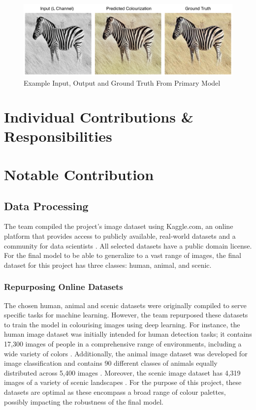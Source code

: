 \documentclass{article} %
\begin{document}
\begin{figure}[htbp]            %
  \centering
  \includegraphics[width=0.99\linewidth]{Figs/final-model-example.png}
  \caption{Example Input, Output and Ground Truth From Primary Model}
  \label{fig:final-model}
\end{figure}

\section{Individual Contributions \& Responsibilities}

\section{Notable Contribution}

\subsection{Data Processing}

 The team compiled the project's image dataset using Kaggle.com, an online platform that provides access to publicly available, real-world datasets and a community for data scientists \citep[]{kaggle}. All selected datasets have a public domain license. For the final model to be able to generalize to a vast range of images, the final dataset for this project has three classes: human, animal, and scenic.

 \subsubsection{Repurposing Online Datasets}

 The chosen human, animal and scenic datasets were originally compiled to serve specific tasks for machine learning. However, the team repurposed these datasets to train the model in colourising images using deep learning. For instance, the human image dataset was initially intended for human detection tasks; it contains 17,300 images of people in a comprehensive range of environments, including a wide variety of colors \citep[]{kaggle_human}. Additionally, the animal image dataset was developed for image classification and contains 90 different classes of animals equally distributed across 5,400 images \citep[]{kaggle_animal}. Moreover, the scenic image dataset has 4,319 images of a variety of scenic landscapes \citep{kaggle_scene}. For the purpose of this project, these datasets are optimal as these encompass a broad range of colour palettes, possibly impacting the robustness of the final model.
\end{document}
